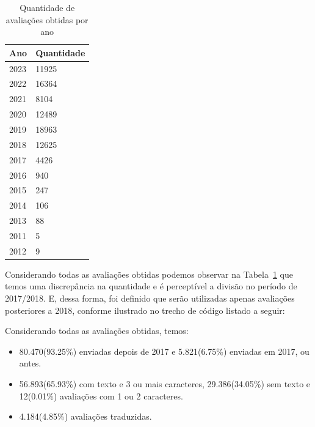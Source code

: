 \begin{table}[]
	\centering
	\begin{tabular}{|l|l|}
		\hline
		\textbf{Ano} & \textbf{Quantidade} \\\hline
		2023         & 11925               \\
		2022         & 16364               \\
		2021         & 8104                \\
		2020         & 12489               \\
		2019         & 18963               \\
		2018         & 12625               \\
		2017         & 4426                \\
		2016         & 940                 \\
		2015         & 247                 \\
		2014         & 106                 \\
		2013         & 88                  \\
		2011         & 5                   \\
		2012         & 9                   \\
		\hline
	\end{tabular}%
	\caption{Quantidade de avaliações obtidas por ano}
	\label{table:review_per_year}
\end{table}

Considerando todas as avaliações obtidas podemos observar na Tabela~\ref{table:review_per_year} que temos uma discrepância na quantidade e é perceptível a divisão no período de 2017/2018. E, dessa forma, foi definido que serão utilizadas apenas avaliações posteriores a 2018, conforme ilustrado no trecho de código listado a seguir:



Considerando todas as avaliações obtidas, temos:

\begin{itemize}
	\item 80.470(93.25\%) enviadas depois de 2017 e 5.821(6.75\%) enviadas em 2017, ou antes.
	\item 56.893(65.93\%) com texto e 3 ou mais caracteres, 29.386(34.05\%) sem texto e 12(0.01\%) avaliações com 1 ou 2 caracteres.
	\item 4.184(4.85\%) avaliações traduzidas.
\end{itemize}

